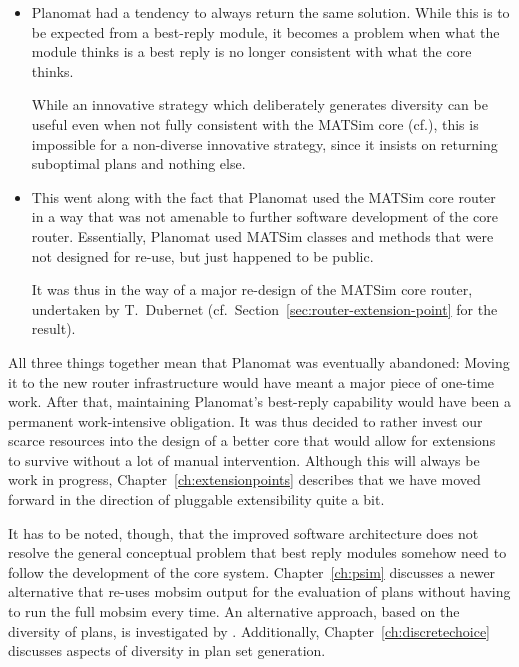 \begin{itemize}

\item Planomat had a tendency to always return the same solution.  While this is to be expected from a best-reply module, it becomes a problem when what the module thinks is a best reply is no longer consistent with what the core thinks.  

While an innovative strategy which deliberately generates  diversity can be useful even when not fully consistent with the MATSim core (cf.\cite{NagelKickhoeferJoubertHeterogeneousVoTs}), this is impossible for a non-diverse innovative strategy, since it insists on returning suboptimal plans and nothing else.

\item This went along with the fact that Planomat used the MATSim core router in a way that was not amenable to further software development of the core router.  Essentially, Planomat used MATSim classes and methods that were not designed for re-use, but just happened to be public.

It was thus in the way of a major re-design of the MATSim core router, undertaken by T.~Dubernet (cf.~Section~\ref{sec:router-extension-point} for the result).

\end{itemize}

All three things together mean that Planomat was eventually abandoned: Moving it to the new router infrastructure would have meant a major piece of one-time work.  After that, maintaining Planomat's best-reply capability would have been a permanent work-intensive obligation.  It was thus decided to rather invest our scarce resources into the design of a better core that would allow for extensions to survive without a lot of manual intervention.  Although this will always be work in progress, Chapter~\ref{ch:extensionpoints} describes that we have moved forward in the direction of pluggable extensibility quite a bit.

 It has to be noted, though, that the improved software architecture does not resolve the general conceptual problem that best reply modules somehow need to follow the development of the core system.  Chapter~\ref{ch:psim} discusses a newer alternative that re-uses mobsim output for the evaluation of plans without having to run the full mobsim every time. An alternative approach, based on the diversity of plans, is investigated by \cite{NagelKickhoeferJoubertHeterogeneousVoTs}.  Additionally, Chapter~\ref{ch:discretechoice} discusses aspects of diversity in plan set generation.

